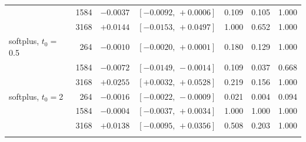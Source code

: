 {\begin{tabular}{@{}lrrcrrr@{}}
 & 1584 & $-0.0037$ & $[-0.0092,\,+0.0006]$ & 0.109 & 0.105 & 1.000 \\
 & 3168 & $+0.0144$ & $[-0.0153,\,+0.0497]$ & 1.000 & 0.652 & 1.000 \\
\addlinespace[2pt]
softplus, $t_0{=}$0.5 & 264 & $-0.0010$ & $[-0.0020,\,+0.0001]$ & 0.180 & 0.129 & 1.000 \\
 & 1584 & $-0.0072$ & $[-0.0149,\,-0.0014]$ & 0.109 & 0.037 & 0.668 \\
 & 3168 & $+0.0255$ & $[+0.0032,\,+0.0528]$ & 0.219 & 0.156 & 1.000 \\
\addlinespace[2pt]
softplus, $t_0{=}$2 & 264 & $-0.0016$ & $[-0.0022,\,-0.0009]$ & 0.021 & 0.004 & 0.094 \\
 & 1584 & $-0.0004$ & $[-0.0037,\,+0.0034]$ & 1.000 & 1.000 & 1.000 \\
 & 3168 & $+0.0138$ & $[-0.0095,\,+0.0356]$ & 0.508 & 0.203 & 1.000 \\
\addlinespace[2pt]
\bottomrule
\end{tabular}
}

